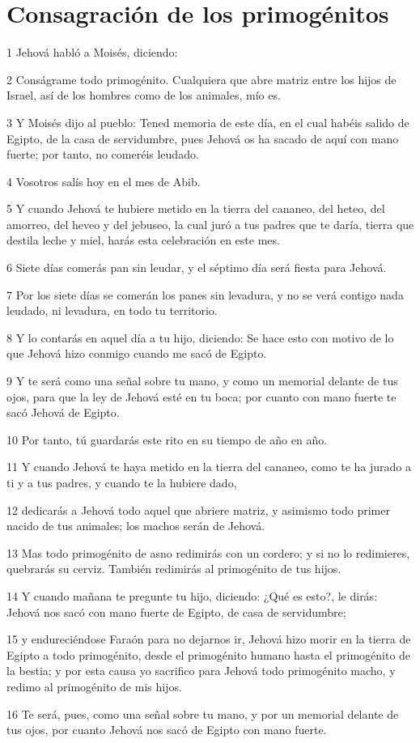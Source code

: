 \section*{Consagración de los primogénitos}

\par 1 Jehová habló a Moisés, diciendo:
\par 2 Conságrame todo primogénito. Cualquiera que abre matriz entre los hijos de Israel, así de los hombres como de los animales, mío es.
\par 3 Y Moisés dijo al pueblo: Tened memoria de este día, en el cual habéis salido de Egipto, de la casa de servidumbre, pues Jehová os ha sacado de aquí con mano fuerte; por tanto, no comeréis leudado.
\par 4 Vosotros salís hoy en el mes de Abib.
\par 5 Y cuando Jehová te hubiere metido en la tierra del cananeo, del heteo, del amorreo, del heveo y del jebuseo, la cual juró a tus padres que te daría, tierra que destila leche y miel, harás esta celebración en este mes.
\par 6 Siete días comerás pan sin leudar, y el séptimo día será fiesta para Jehová.
\par 7 Por los siete días se comerán los panes sin levadura, y no se verá contigo nada leudado, ni levadura, en todo tu territorio.
\par 8 Y lo contarás en aquel día a tu hijo, diciendo: Se hace esto con motivo de lo que Jehová hizo conmigo cuando me sacó de Egipto.
\par 9 Y te será como una señal sobre tu mano, y como un memorial delante de tus ojos, para que la ley de Jehová esté en tu boca; por cuanto con mano fuerte te sacó Jehová de Egipto.
\par 10 Por tanto, tú guardarás este rito en su tiempo de año en año.
\par 11 Y cuando Jehová te haya metido en la tierra del cananeo, como te ha jurado a ti y a tus padres, y cuando te la hubiere dado,
\par 12 dedicarás a Jehová todo aquel que abriere matriz, y asimismo todo primer nacido de tus animales; los machos serán de Jehová.
\par 13 Mas todo primogénito de asno redimirás con un cordero; y si no lo redimieres, quebrarás su cerviz. También redimirás al primogénito de tus hijos.
\par 14 Y cuando mañana te pregunte tu hijo, diciendo: ¿Qué es esto?, le dirás: Jehová nos sacó con mano fuerte de Egipto, de casa de servidumbre;
\par 15 y endureciéndose Faraón para no dejarnos ir, Jehová hizo morir en la tierra de Egipto a todo primogénito, desde el primogénito humano hasta el primogénito de la bestia; y por esta causa yo sacrifico para Jehová todo primogénito macho, y redimo al primogénito de mis hijos.
\par 16 Te será, pues, como una señal sobre tu mano, y por un memorial delante de tus ojos, por cuanto Jehová nos sacó de Egipto con mano fuerte.

